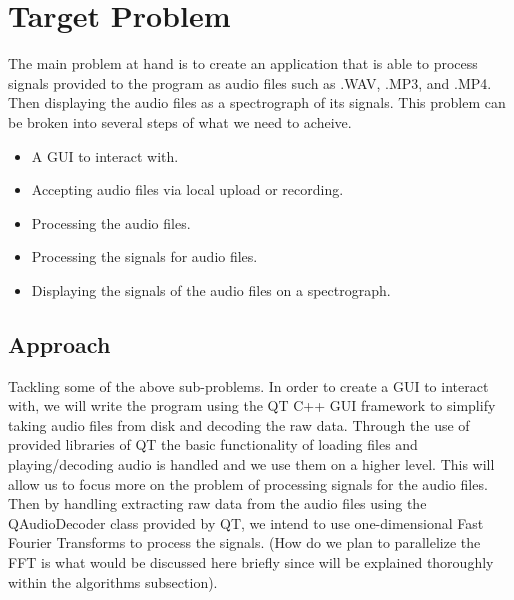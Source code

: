 \documentclass[journal]{IEEEtran}
\begin{document}
\section{Target Problem}
	\par {The main problem at hand is to create an application that is able to process signals
	provided to the program as audio files such as .WAV, .MP3, and .MP4. Then displaying the audio
	files as a spectrograph of its signals. This problem can be broken into several steps of
	what we need to acheive.}

\begin{itemize}
	\item A GUI to interact with.
	\item Accepting audio files via local upload or recording.
	\item Processing the audio files.
	\item Processing the signals for audio files.
	\item Displaying the signals of the audio files on a spectrograph.
\end{itemize}

\subsection{Approach}
	\par {Tackling some of the above sub-problems. In order to create a GUI to interact with,
	we will write the program using the QT C++ GUI framework to simplify taking audio files
	from disk and decoding the raw data. Through the use of provided libraries of QT the
	basic functionality of loading files and playing/decoding audio is handled and we use
	them on a higher level. This will allow us to focus more on the problem of processing
	signals for the audio files. Then by handling extracting raw data from the audio files
	using the QAudioDecoder class provided by QT, we intend to use one-dimensional Fast
	Fourier Transforms to process the signals. (How do we plan to parallelize the FFT is
	what would be discussed here briefly since will be explained thoroughly within
	the algorithms subsection).}
\end{document}
